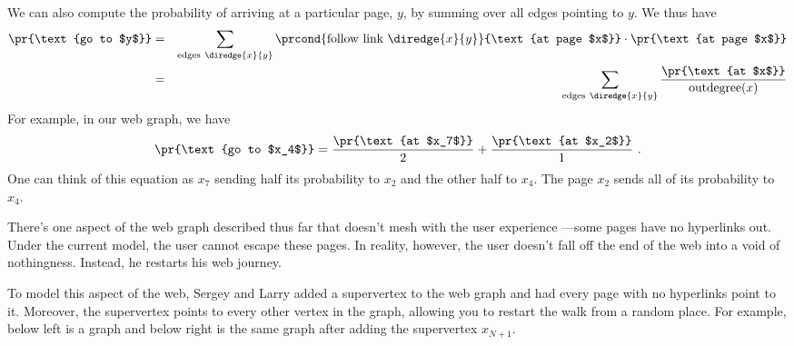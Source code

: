 \begin{example}
We can also compute the probability of arriving at a particular page, $y$,
by summing over all edges pointing to $y$.  We thus have
\begin{eqnarray}
  \pr{\text{go to $y$}} &=&  \sum_{\text{edges}\ \diredge{x}{y}}
  \prcond{\text{follow link}\ \diredge{x}{y}}{\text{at page $x$}} \cdot
  \pr{\text{at page $x$}} \nonumber\\
  &=& \sum_{\text{edges}\ \diredge{x}{y}} \frac{\pr{\text{at
      $x$}}}{\text{outdegree}(x)} \label{LN12:stepprob}
\end{eqnarray}
For example, in our web graph, we have
\[ \pr{\text{go to $x_4$}} = \frac{\pr{\text{at $x_7$}}}{2} +
\frac{\pr{\text{at $x_2$}}}{1} \ .
\]
One can think of this equation as $x_7$ sending half its probability to
$x_2$ and the other half to $x_4$. The page $x_2$ sends all of its
probability to $x_4$.

There's one aspect of the web graph described thus far that doesn't mesh
with the user experience ---some pages have no hyperlinks out.  Under the
current model, the user cannot escape these pages.  In reality, however,
the user doesn't fall off the end of the web into a void of nothingness.
Instead, he restarts his web journey.

To model this aspect of the web, Sergey and Larry added a supervertex to the
web graph and had every page with no hyperlinks point to it.  Moreover,
the supervertex points to every other vertex in the graph, allowing you to
restart the walk from a random place.  For example, below left is a graph
and below right is the same graph after adding the supervertex $x_{N+1}$.


\end{example}
